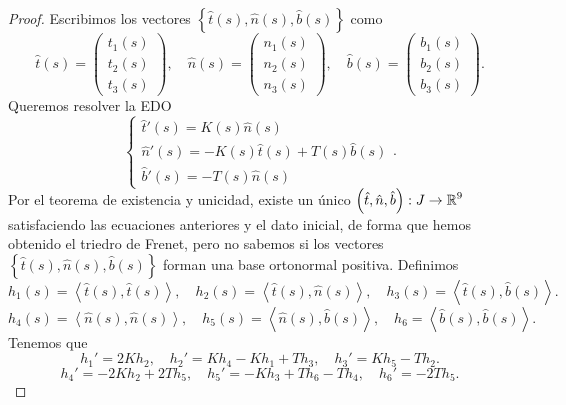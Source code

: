 \begin{proof}
	Escribimos los vectores $\displaystyle \left\{ \hat{t}\left(s\right), \hat{n}\left(s\right), \hat{b}\left(s\right)\right\}  $ como 
	\[\hat{t}\left(s\right)=\begin{pmatrix} t_{1}\left(s\right) \\ t_{2}\left(s\right) \\ t_{3}\left(s\right) \end{pmatrix}, \quad \hat{n}\left(s\right)=\begin{pmatrix} n_{1}\left(s\right) \\ n_{2}\left(s\right) \\ n_{3}\left(s\right) \end{pmatrix}, \quad \hat{b}\left(s\right)=\begin{pmatrix} b_{1}\left(s\right) \\ b_{2}\left(s\right) \\ b_{3}\left(s\right) \end{pmatrix} .\]
Queremos resolver la EDO
\[
\begin{cases}
\hat{t}'\left(s\right)=K\left(s\right)\hat{n}\left(s\right) \\
\hat{n}'\left(s\right)=-K\left(s\right)\hat{t}\left(s\right) + T\left(s\right)\hat{b}\left(s\right) \\
\hat{b}'\left(s\right)=-T\left(s\right)\hat{n}\left(s\right)
\end{cases}
.\]
Por el teorema de existencia y unicidad, existe un único $\displaystyle \left(\hat{t}, \hat{n}, \hat{b}\right) : J \to \mathbb{R}^{9} $ satisfaciendo las ecuaciones anteriores y el dato inicial, de forma que hemos obtenido el triedro de Frenet, pero no sabemos si los vectores $\displaystyle \left\{ \hat{t}\left(s\right), \hat{n}\left(s\right), \hat{b}\left(s\right)\right\}  $ forman una base ortonormal positiva. Definimos
\[h_{1}\left(s\right)=\left\langle \hat{t}\left(s\right), \hat{t}\left(s\right) \right\rangle , \quad h_{2}\left(s\right)=\left\langle \hat{t}\left(s\right), \hat{n}\left(s\right) \right\rangle , \quad h_{3}\left(s\right)=\left\langle \hat{t}\left(s\right), \hat{b}\left(s\right) \right\rangle  .\]
\[h_{4}\left(s\right)=\left\langle \hat{n}\left(s\right), \hat{n}\left(s\right) \right\rangle , \quad h_{5}\left(s\right)=\left\langle \hat{n}\left(s\right), \hat{b}\left(s\right) \right\rangle , \quad h_{6}=\left\langle \hat{b}\left(s\right), \hat{b}\left(s\right) \right\rangle  .\]
Tenemos que 
\[h_{1}' = 2Kh_{2}, \quad h_{2}' = Kh_{4}-Kh_{1}+Th_{3}, \quad h_{3}' =  Kh_{5} - Th_{2}.\]
\[h_{4}' = -2K h_{2} + 2Th_{5}, \quad h_{5}' = -Kh_{3}+Th_{6}-Th_{4}, \quad h_{6}'=-2Th_{5} .\]

\end{proof}
